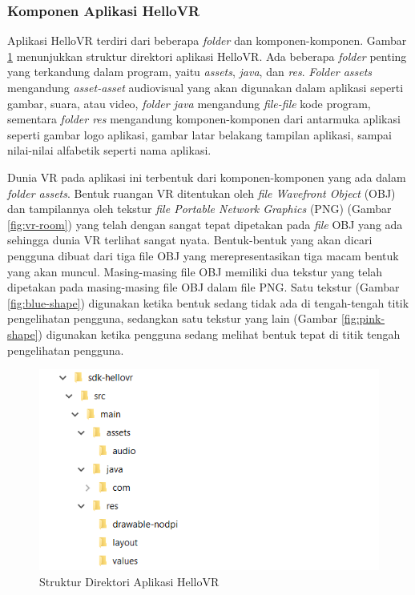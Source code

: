 \subsubsection{Komponen Aplikasi HelloVR}
Aplikasi HelloVR terdiri dari beberapa \textit{folder} dan komponen-komponen. Gambar \ref{fig:hello-vr-dir} menunjukkan struktur direktori aplikasi HelloVR. Ada beberapa \textit{folder} penting yang terkandung dalam program, yaitu \textit{assets}, \textit{java}, dan \textit{res}. \textit{Folder assets} mengandung \textit{asset-asset} audiovisual yang akan digunakan dalam aplikasi seperti gambar, suara, atau video, \textit{folder java} mengandung \textit{file-file} kode program, sementara \textit{folder res} mengandung komponen-komponen dari antarmuka aplikasi seperti gambar logo aplikasi, gambar latar belakang tampilan aplikasi, sampai nilai-nilai alfabetik seperti nama aplikasi. 

Dunia VR pada aplikasi ini terbentuk dari komponen-komponen yang ada dalam \textit{folder assets}. Bentuk ruangan VR ditentukan oleh {\it file Wavefront Object} (OBJ) dan tampilannya oleh tekstur {\it file Portable Network Graphics} (PNG) (Gambar \ref{fig:vr-room}) yang telah dengan sangat tepat dipetakan pada \textit{file} OBJ yang ada sehingga dunia VR terlihat sangat nyata. Bentuk-bentuk yang akan dicari pengguna dibuat dari tiga file OBJ yang merepresentasikan tiga macam bentuk yang akan muncul. Masing-masing file OBJ memiliki dua tekstur yang telah dipetakan pada masing-masing file OBJ dalam file PNG. Satu tekstur (Gambar \ref{fig:blue-shape}) digunakan ketika bentuk sedang tidak ada di tengah-tengah titik pengelihatan pengguna, sedangkan satu tekstur yang lain (Gambar \ref{fig:pink-shape}) digunakan ketika pengguna sedang melihat bentuk tepat di titik tengah pengelihatan pengguna.

\begin{figure}[h]
	\centering
		\includegraphics[scale=1.0]{Gambar/hello_vr_dir.png}
	\caption{Struktur Direktori Aplikasi HelloVR}
	\label{fig:hello-vr-dir}
\end{figure}

